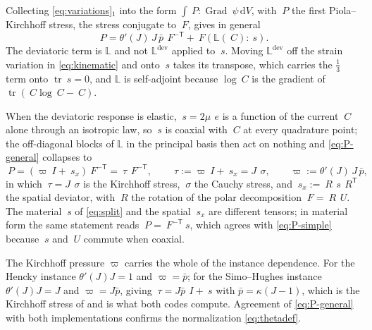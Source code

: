 \documentclass[11pt]{article}
\newcommand{\F}{~F}
\newcommand{\C}{~C}
\newcommand{\Id}{~I}
\renewcommand{\P}{~P}
\newcommand{\edev}{~e}
\newcommand{\sdev}{~s}
\newcommand{\sdevx}{~s_{\!x}}
\newcommand{\btau}{~\tau}
\newcommand{\testd}{~\psi}
\newcommand{\Grad}{\operatorname{Grad}}
\newcommand{\trace}{\operatorname{tr}}
\newcommand{\transpose}[1]{#1^{\mathsf{T}}}
\newcommand{\diff}{\,\mathrm{d}}
\newcommand{\supdev}{^{\mathrm{dev}}}
\theoremstyle{definition}
\theoremstyle{plain}
\begin{document}
Collecting \eqref{eq:variations}$_1$ into the form $\int \P : \Grad\testd
\diff V$, with $\P$ the first Piola--Kirchhoff stress, the stress conjugate to
$\F$, gives in general
\begin{equation}
  \label{eq:P-general}
  \P = \theta'(J)\, J\, \bar p\, \F^{-\mathsf{T}}
     + \F \left( \mathbb{L}(\C) : \sdev \right).
\end{equation}
The deviatoric term is $\mathbb{L}$ and not $\mathbb{L}\supdev$ applied to
$\sdev$. Moving $\mathbb{L}\supdev$ off the strain variation in
\eqref{eq:kinematic} and onto $\sdev$ takes its transpose, which carries the
$\tfrac13$ term onto $\trace\sdev = 0$, and $\mathbb{L}$ is self-adjoint
because $\log\C$ is the gradient of $\trace(\C\log\C - \C)$.

When the deviatoric response is elastic, $\sdev = 2\mu\,\edev$ is a
function of the current $\C$ alone through an isotropic law, so $\sdev$ is
coaxial with $\C$ at every quadrature point; the off-diagonal blocks of
$\mathbb{L}$ in the principal basis then act on nothing and
\eqref{eq:P-general} collapses to
\begin{equation}
  \label{eq:P-simple}
  \P = \left( \varpi \Id + \sdevx \right) \F^{-\mathsf{T}} = \btau \, \F^{-\mathsf{T}},
  \qquad
  \btau := \varpi \Id + \sdevx = J\,~\sigma,
  \qquad
  \varpi := \theta'(J)\, J\, \bar p ,
\end{equation}
in which $\btau = J\,~\sigma$ is the Kirchhoff stress, $~\sigma$ the Cauchy
stress, and $\sdevx := ~R\,\sdev\,\transpose{~R}$ the spatial deviator, with
$~R$ the rotation of the polar decomposition $\F = ~R\,~U$. The material
$\sdev$ of \eqref{eq:split} and the spatial $\sdevx$ are different tensors; in
material form
the same statement reads $\P = \F^{-\mathsf T}\sdev$, which agrees with
\eqref{eq:P-simple} because $\sdev$ and $~U$ commute when coaxial.

The Kirchhoff pressure $\varpi$ carries the whole of the instance dependence.
For the Hencky instance $\theta'(J)J = 1$ and $\varpi = \bar p$; for the
Simo--Hughes instance $\theta'(J)J = J$ and $\varpi = J\bar p$, giving
$\btau = J\bar p\,\Id + \sdev$ with $\bar p = \kappa(J-1)$, which is the
Kirchhoff stress of \citet[BOX 9.1]{SimoHughes:1998} and is what both codes
compute. Agreement of \eqref{eq:P-general} with both implementations confirms
the normalization \eqref{eq:thetadef}.
\end{document}
